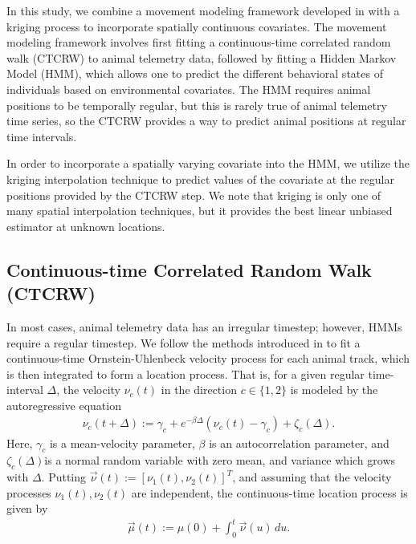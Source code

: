 \documentclass[12pt]{article}
\begin{document}
	In this study, we combine a movement modeling framework developed in \cite{Johnson2008, McClintock2012, Michelot2016, Whoriskey2017, McClintock2018} with a kriging process to incorporate spatially continuous covariates. The movement modeling framework involves first fitting a continuous-time correlated random walk (CTCRW) to animal telemetry data, followed by fitting a Hidden Markov Model (HMM), which allows one to predict the different behavioral states of individuals based on environmental covariates. The HMM requires animal positions to be temporally regular, but this is rarely true of animal telemetry time series, so the CTCRW provides a way to predict animal positions at regular time intervals.
	
	 In order to incorporate a spatially varying covariate into the HMM, we utilize the kriging interpolation technique to predict values of the covariate at the regular positions provided by the CTCRW step. We note that kriging is only one of many spatial interpolation techniques, but it provides the best linear unbiased estimator at unknown locations.
	
	
	\subsection{Continuous-time Correlated Random Walk (CTCRW)}
	
	In most cases, animal telemetry data has an irregular timestep; however, HMMs require a regular timestep. We follow the methods introduced in \cite{Johnson2008} to fit a continuous-time Ornstein-Uhlenbeck velocity process for each animal track, which is then integrated to form a location process. That is, for a given regular time-interval $\Delta$, the velocity $\nu_c(t)$ in the direction $c \in \{1, 2\}$ is modeled by the autoregressive equation
	\begin{align}
		\nu_c(t + \Delta) := \gamma_c + e^{-\beta \Delta} (\nu_c(t) - \gamma_c) + \zeta_c(\Delta). \label{eqn:velocity}
	\end{align}
	Here, $\gamma_c$ is a mean-velocity parameter, $\beta$ is an autocorrelation parameter, and $\zeta_c(\Delta)$is a normal random variable with zero mean, and variance which grows with $\Delta$. Putting $\vec \nu(t) := [\nu_1(t), \nu_2(t)]^T$, and assuming that the velocity processes $\nu_1(t), \nu_2(t)$ are independent, the continuous-time location process is given by
	\begin{align}
		\vec \mu(t) := \mu(0) + \int_0^t \vec \nu(u) \, du. \label{eqn:position}
	\end{align}
	
\end{document}
